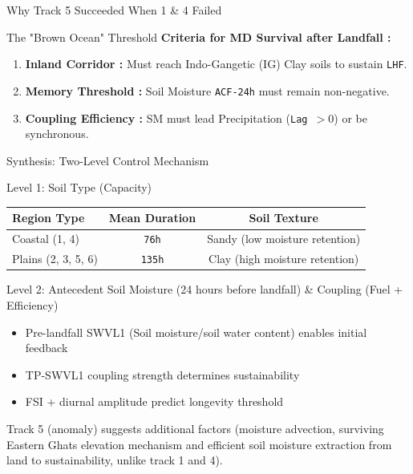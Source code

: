\documentclass[8pt, aspectratio=169]{beamer}
\begin{document}
\begin{frame}{Why Track 5 Succeeded When 1 \& 4 Failed}
    \vspace{0.2cm}
    \begin{block}{The "Brown Ocean" Threshold}
        \textbf{Criteria for MD Survival after Landfall :}
        \begin{enumerate}
            \item \textbf{Inland Corridor :} Must reach Indo-Gangetic (IG) Clay soils to sustain \texttt{LHF}.
            \item \textbf{Memory Threshold :} Soil Moisture \texttt{ACF-24h} must remain non-negative.
            \item \textbf{Coupling Efficiency :} SM must lead Precipitation (\texttt{Lag $>0$}) or be synchronous.
        \end{enumerate}
    \end{block}
\end{frame}

\begin{frame}{Synthesis: Two-Level Control Mechanism}
    \footnotesize
    \begin{block}{Level 1: Soil Type (Capacity)}
        \centering
        \begin{tabular}{lcc}
            \toprule
            \textbf{Region Type} & \textbf{Mean Duration} & \textbf{Soil Texture}          \\
            \midrule
            Coastal (1, 4)       & \texttt{76h}                    & Sandy (low moisture retention) \\
            Plains (2, 3, 5, 6)  & \texttt{135h}                   & Clay (high moisture retention) \\
            \bottomrule
        \end{tabular}
    \end{block}

    \vspace{0.3cm}
    \footnotesize
    \begin{block}{Level 2: Antecedent Soil Moisture (24 hours before landfall) \& Coupling (Fuel + Efficiency)}
        \begin{itemize}
            \item Pre-landfall SWVL1 (Soil moisture/soil water content) enables initial feedback
            \item TP-SWVL1 coupling strength determines sustainability
            \item FSI + diurnal amplitude predict longevity threshold
        \end{itemize}
    \end{block}

    \vspace{0.3cm}
    \footnotesize
    Track 5 (anomaly) suggests additional factors (moisture advection, surviving Eastern Ghats elevation mechanism and efficient soil moisture extraction from land to sustainability, unlike track 1 and 4).
\end{frame}
\end{document}
